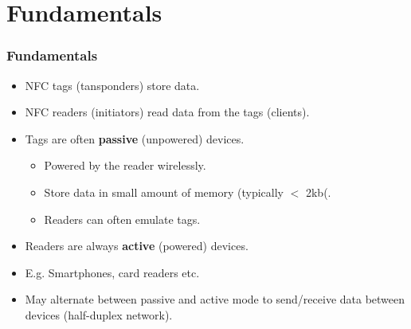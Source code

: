 \documentclass{beamer}
\begin{document}
\section{Fundamentals}
\begin{frame}
\frametitle{Fundamentals}
\begin{itemize}
\item NFC {\color{red}tags} ({\color{green}tansponders}) store data.
\item NFC {\color{purple}readers} ({\color{orange}initiators}) read data from the tags (clients).
\item {\color{red}Tags} are often \textbf{passive} (unpowered) devices.
\begin{itemize}
\item Powered by the reader wirelessly.
\item Store data in small amount of memory (typically $<$ 2kb(.
\item Readers can often emulate tags.
\end{itemize}
\item {\color{purple}Readers} are always \textbf{active} (powered) devices.
\item E.g. Smartphones, card readers etc.
\item May alternate between passive and active mode to send/receive data between devices (half-duplex network).
\end{itemize}
\end{frame}
\end{document}
